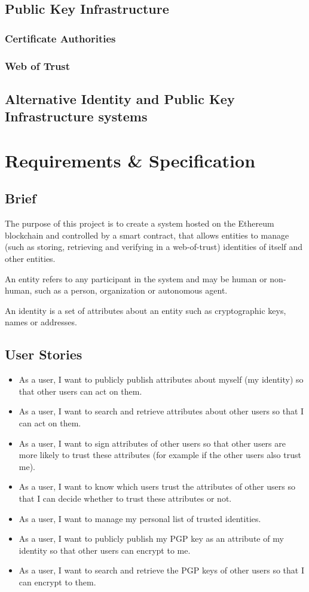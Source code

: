 \documentclass[12pt,a4paper]{report}
\begin{document}
	\section{Public Key Infrastructure}
	\subsection{Certificate Authorities}
	\subsection{Web of Trust}
	\section{Alternative Identity and Public Key Infrastructure systems}
	
	\chapter{Requirements \& Specification}
	\section{Brief}
	The purpose of this project is to create a system hosted on the Ethereum blockchain and controlled by a smart contract, that allows entities to manage (such as storing, retrieving and verifying in a web-of-trust) identities of itself and other entities.
	
	An entity refers to any participant in the system and may be human or non-human, such as a person, organization or autonomous agent.
	
	An identity is a set of attributes about an entity such as cryptographic keys, names or addresses.
	
	\section{User Stories}
	\begin{itemize}
		\item As a user, I want to publicly publish attributes about myself (my identity) so that other users can act on them.
		\item As a user, I want to search and retrieve attributes about other users so that I can act on them.
		\item As a user, I want to sign attributes of other users so that other users are more likely to trust these attributes (for example if the other users also trust me).
		\item As a user, I want to know which users trust the attributes of other users so that I can decide whether to trust these attributes or not.
		\item As a user, I want to manage my personal list of trusted identities.
		\item As a user, I want to publicly publish my PGP key as an attribute of my identity so that other users can encrypt to me.
		\item As a user, I want to search and retrieve the PGP keys of other users so that I can encrypt to them.
	\end{itemize}
	
\end{document}
